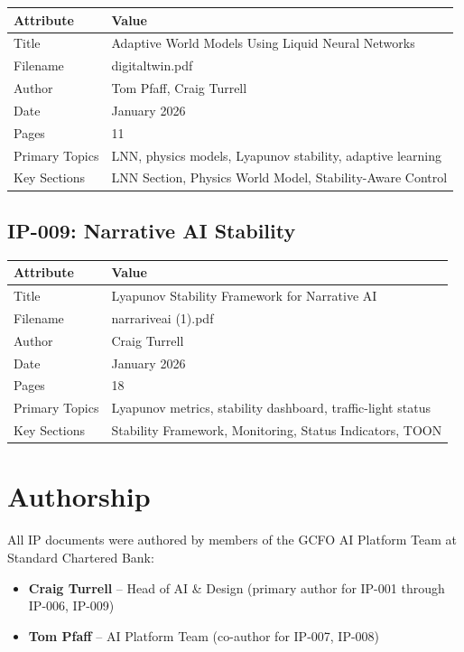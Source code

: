 \begin{tabularx}{\textwidth}{@{}lX@{}}
\toprule
\textbf{Attribute} & \textbf{Value} \\
\midrule
Title & Adaptive World Models Using Liquid Neural Networks \\
Filename & digitaltwin.pdf \\
Author & Tom Pfaff, Craig Turrell \\
Date & January 2026 \\
Pages & 11 \\
Primary Topics & LNN, physics models, Lyapunov stability, adaptive learning \\
Key Sections & LNN Section, Physics World Model, Stability-Aware Control \\
\bottomrule
\end{tabularx}

\subsection{IP-009: Narrative AI Stability}

\begin{tabularx}{\textwidth}{@{}lX@{}}
\toprule
\textbf{Attribute} & \textbf{Value} \\
\midrule
Title & Lyapunov Stability Framework for Narrative AI \\
Filename & narrariveai (1).pdf \\
Author & Craig Turrell \\
Date & January 2026 \\
Pages & 18 \\
Primary Topics & Lyapunov metrics, stability dashboard, traffic-light status \\
Key Sections & Stability Framework, Monitoring, Status Indicators, TOON \\
\bottomrule
\end{tabularx}

\section{Authorship}

All IP documents were authored by members of the GCFO AI Platform Team at Standard Chartered Bank:

\begin{itemize}[nosep]
    \item \textbf{Craig Turrell} -- Head of AI \& Design (primary author for IP-001 through IP-006, IP-009)
    \item \textbf{Tom Pfaff} -- AI Platform Team (co-author for IP-007, IP-008)
\end{itemize}

